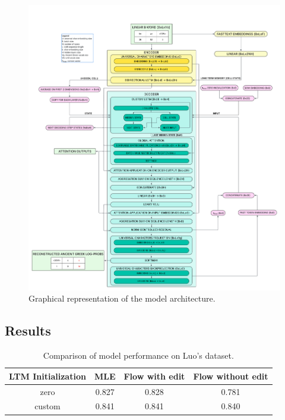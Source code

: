 \begin{figure}[H]
    \centering
    \includegraphics[width=1.2\textwidth]{Images/luo_model.png} %
    \caption{Graphical representation of the model architecture.}
    \label{fig:luo_model}
\end{figure}

\newpage

\subsection{Results} \label{sec:results}
\begin{table}[h!]
\centering
\begin{tabular}{|c|c|c|c|}
\hline
\textbf{LTM Initialization} & \textbf{MLE} & \textbf{Flow with edit} & \textbf{Flow without edit} \\
\hline
zero & 0.827 & 0.828 & 0.781 \\
custom & 0.841 & 0.841 & 0.840 \\
\hline
\end{tabular}
\caption{Comparison of model performance on Luo's dataset.}
\end{table}


